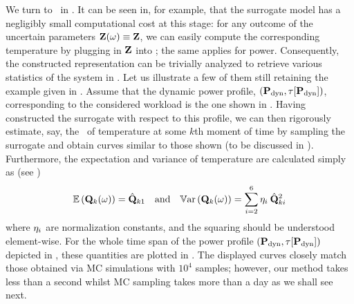 

We turn to \ in .
It can be seen in, for example,  that the surrogate model has a negligibly small computational cost at this stage: for any outcome of the uncertain parameters $\mathbf{Z}(\omega) \equiv \mathbf{Z}$, we can easily compute the corresponding temperature by plugging in $\mathbf{Z}$ into ; the same applies for power.
Consequently, the constructed representation can be trivially analyzed to retrieve various statistics of the system in .
Let us illustrate a few of them still retaining the example given in .
Assume that the dynamic power profile, $\profilePdyn$, corresponding to the considered workload is the one shown in .
Having constructed the surrogate with respect to this profile, we can then rigorously estimate, say, the \pdf\ of temperature at some $k$th moment of time by sampling the surrogate and obtain curves similar to those shown  (to be discussed in ).
Furthermore, the expectation and variance of temperature are calculated simply as (see )
\[
  \mathbb{E}\left(\mathbf{Q}_k(\omega)\right) = \hat{\mathbf{Q}}_{k1} \hspace{1em} \text{and} \hspace{1em} \mathbb{V}\text{ar}\left(\mathbf{Q}_k(\omega)\right) = \sum_{i = 2}^{6} \eta_i \: \hat{\mathbf{Q}}_{ki}^2
\]
where $\eta_i$ are normalization constants, and the squaring should be understood element-wise.
For the whole time span of the power profile $\profilePdyn$ depicted in , these quantities are plotted in .
The displayed curves closely match those obtained via MC simulations with $10^4$ samples; however, our method takes less than a second whilst MC sampling takes more than a day as we shall see next.
